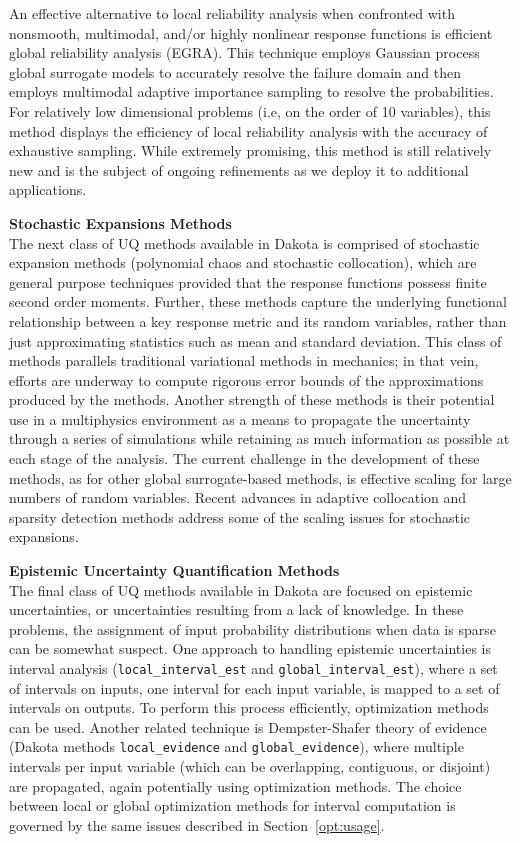 An effective alternative to local reliability analysis when confronted
with nonsmooth, multimodal, and/or highly nonlinear response functions
is efficient global reliability analysis (EGRA). This technique
employs Gaussian process global surrogate models to accurately resolve
the failure domain and then employs multimodal adaptive importance
sampling to resolve the probabilities. For relatively low dimensional
problems (i.e, on the order of 10 variables), this method displays the
efficiency of local reliability analysis with the accuracy of
exhaustive sampling. While extremely promising, this method is still
relatively new and is the subject of ongoing refinements as we deploy
it to additional applications.

{\bf Stochastic Expansions Methods} \\
The next class of UQ methods available in Dakota is comprised of
stochastic expansion methods (polynomial chaos and stochastic
collocation), which are general purpose techniques provided that the
response functions possess finite second order moments. Further, these
methods capture the underlying functional relationship between a key
response metric and its random variables, rather than just
approximating statistics such as mean and standard deviation. This
class of methods parallels traditional variational methods in
mechanics; in that vein, efforts are underway to compute rigorous
error bounds of the approximations produced by the methods. Another
strength of these methods is their potential use in a multiphysics
environment as a means to propagate the uncertainty through a series
of simulations while retaining as much information as possible at each
stage of the analysis. The current challenge in the development of
these methods, as for other global surrogate-based methods, is
effective scaling for large numbers of random variables. Recent
advances in adaptive collocation and sparsity detection methods
address some of the scaling issues for stochastic expansions.

{\bf Epistemic Uncertainty Quantification Methods} \\
The final class of UQ methods available in Dakota are focused on
epistemic uncertainties, or uncertainties resulting from a lack of
knowledge. In these problems, the assignment of input probability
distributions when data is sparse can be somewhat suspect. One
approach to handling epistemic uncertainties is interval analysis
(\texttt{local\_interval\_est} and \texttt{global\_interval\_est}),
where a set of intervals on inputs, one interval for each input
variable, is mapped to a set of intervals on outputs.  To perform this
process efficiently, optimization methods can be used.  Another
related technique is Dempster-Shafer theory of evidence (Dakota
methods \texttt{local\_evidence} and \texttt{global\_evidence}), where
multiple intervals per input variable (which can be overlapping,
contiguous, or disjoint) are propagated, again potentially using
optimization methods.  The choice between local or global optimization
methods for interval computation is governed by the same issues
described in Section~\ref{opt:usage}.

